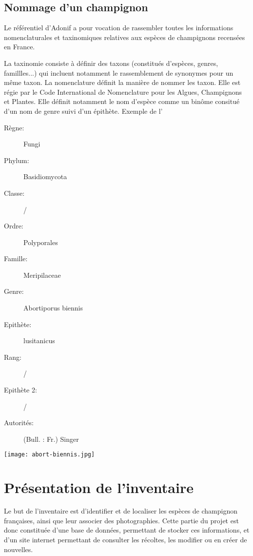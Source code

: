 \documentclass[11pt, a4paper, twoside]{report}
\begin{document}
\subsection{Nommage d'un champignon}
Le référentiel d'Adonif a pour vocation de rassembler toutes les informations nomenclaturales et taxinomiques relatives aux espèces de champignons recensées en France.

La taxinomie consiste à définir des taxons (constitués d'espèces, genres, famillles...) qui incluent notamment le rassemblement de synonymes pour un même taxon. La nomenclature définit la manière de nommer les taxon. Elle est régie par le Code International de Nomenclature pour les Algues, Champignons et Plantes. Elle définit notamment le nom d'espèce comme un binôme consitué d'un nom de genre suivi d'un épithète.
Exemple de l'\newline


\begin{minipage}[]{0.49\linewidth}
\begin{description}
\item[Règne: ] Fungi
\item[Phylum: ] Basidiomycota
\item[Classe: ] /
\item[Ordre: ] Polyporales
\item[Famille: ] Meripilaceae
\item[Genre: ] Abortiporus biennis
\item[Epithète: ] lusitanicus
\item[Rang: ] /
\item[Epithète 2: ] /
\item[Autorités: ] (Bull. : Fr.) Singer

\end{description}
\end{minipage}
\begin{minipage}[]{0.49\linewidth}

\flushright
\noindent\texttt{[image: abort-biennis.jpg]}

\end{minipage}

\section{Présentation de l'inventaire}
Le but de l'inventaire est d'identifier et de localiser les espèces de champignon françaises, ainsi que leur associer des photographies. Cette partie du projet est donc constituée d'une base de données, permettant de stocker ces informations, et d'un site internet permettant de consulter les récoltes, les modifier ou en créer de nouvelles.
\end{document}

